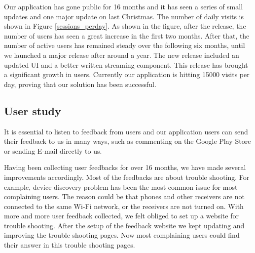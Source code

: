 Our application has gone public for 16 months and it has seen a series of small updates and one major update on last Christmas. The number of daily visits is shown in Figure \ref{sessions_perday}. As shown in the figure, after the release, the number of users has seen a great increase in the first two months. After that, the number of active users has remained steady over the following six months, until we launched a major release after around a year. The new release included an updated UI and a better written streaming component. This release has brought a significant growth in users. Currently our application is hitting 15000 visits per day,  proving that our solution has been successful.


\subsection{User study\label{4_3}}
It is essential to listen to feedback from users and our application users can send their feedback to us in many ways, such as commenting on the Google Play Store or sending E-mail directly to us.

Having been collecting user feedbacks for over 16 months, we have made several improvements accordingly. Most of the feedbacks are about trouble shooting. For example, device discovery problem has been the most common issue for most complaining users. The reason could be that phones and other receivers are not connected to the same Wi-Fi network, or the receivers are not turned on. With more and more user feedback collected, we felt obliged to set up a website for trouble shooting. After the setup of the feedback website we kept updating and improving the trouble shooting pages. Now most complaining users could find their answer in this trouble shooting pages.
